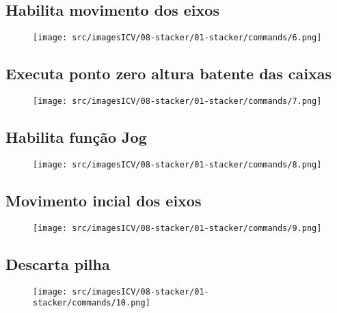 \newpage
\thispagestyle{fancy}
\vspace{\fill}
\subsection{\small Habilita movimento dos eixos}
\begin{figure}
    \centering
    \texttt{[image: src/imagesICV/08-stacker/01-stacker/commands/6.png]}
\end{figure}

\newpage
\thispagestyle{fancy}
\vspace{\fill}
\subsection{\small Executa ponto zero altura batente das caixas}
\begin{figure}
    \centering
    \texttt{[image: src/imagesICV/08-stacker/01-stacker/commands/7.png]}
\end{figure}

\newpage
\thispagestyle{fancy}
\vspace{\fill}
\subsection{\small Habilita função Jog}
\begin{figure}
    \centering
    \texttt{[image: src/imagesICV/08-stacker/01-stacker/commands/8.png]}
\end{figure}

\newpage
\thispagestyle{fancy}
\vspace{\fill}
\subsection{\small Movimento incial dos eixos}
\begin{figure}
    \centering
    \texttt{[image: src/imagesICV/08-stacker/01-stacker/commands/9.png]}
\end{figure}

\newpage
\thispagestyle{fancy}
\vspace{\fill}
\subsection{\small Descarta pilha}
\begin{figure}
    \centering
    \texttt{[image: src/imagesICV/08-stacker/01-stacker/commands/10.png]}
\end{figure}

